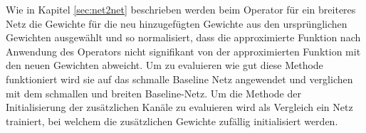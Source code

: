 Wie in Kapitel \ref{sec:net2net} beschrieben werden beim Operator für ein breiteres Netz die Gewichte für die neu hinzugefügten Gewichte aus den ursprünglichen Gewichten ausgewählt und so normalisiert, dass die approximierte Funktion nach Anwendung des Operators nicht signifikant von der approximierten Funktion mit den neuen Gewichten abweicht. Um zu evaluieren wie gut diese Methode funktioniert wird sie auf das schmalle Baseline Netz angewendet und verglichen mit dem schmallen und breiten Baseline-Netz. Um die Methode der Initialisierung der zusätzlichen Kanäle zu evaluieren wird als Vergleich ein Netz trainiert, bei welchem die zusätzlichen Gewichte zufällig initialisiert werden.
\begin{figure}
     \centering
     \hfill
     
     \caption{}
     \label{abb:memory}
\end{figure}

